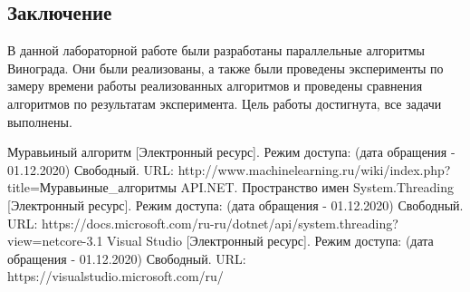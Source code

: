 \documentclass{article}
\begin{document}
	\newpage
	\begin{center}
		\section*{Заключение}
	\end{center}
	\indent \indent В данной лабораторной работе были разработаны параллельные алгоритмы Винограда. Они были реализованы, а также были проведены эксперименты по замеру времени работы реализованных алгоритмов и проведены сравнения алгоритмов по результатам эксперимента. Цель работы достигнута, все задачи выполнены.
	\newpage
	
	\begin{center}
	\begin{thebibliography}{3}
	Муравьиный алгоритм [Электронный ресурс]. Режим доступа: (дата обращения - 01.12.2020) Свободный. URL: http://www.machinelearning.ru/wiki/index.php?title=Муравьиные\_алгоритмы
	API.NET. Пространство имен System.Threading [Электронный ресурс]. Режим доступа: (дата обращения - 01.12.2020) Свободный. URL: https://docs.microsoft.com/ru-ru/dotnet/api/system.threading?view=netcore-3.1
	Visual Studio [Электронный ресурс]. Режим доступа: (дата обращения - 01.12.2020) Свободный. URL: https://visualstudio.microsoft.com/ru/

	\end{thebibliography}
	\end{center}
\end{document}

